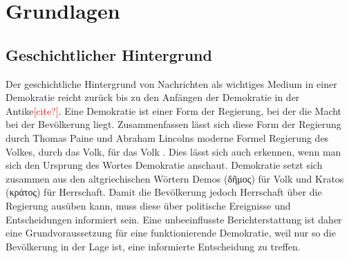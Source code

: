 \section{Grundlagen}

\subsection{Geschichtlicher Hintergrund}\label{sec:story-background}
Der geschichtliche Hintergrund von Nachrichten als wichtiges Medium in einer Demokratie reicht zurück bis zu den Anfängen der Demokratie in der Antike\textcolor{red}{[cite?]}.
Eine Demokratie ist einer Form der Regierung, bei der die Macht bei der Bevölkerung liegt.
Zusammenfassen lässt sich diese Form der Regierung durch Thomas Paine und Abraham Lincolns moderne Formel \glqq Regierung des Volkes, durch das Volk, für das Volk\grqq{} \cite{lincoln}.
Dies lässt sich auch erkennen, wenn man sich den Ursprung des Wortes Demokratie anschaut.
Demokratie setzt sich zusammen aus den altgriechischen Wörtern Demos (\textgreek{δῆμος}) für Volk und Kratos (\textgreek{κράτος}) für Herrschaft.
Damit die Bevölkerung jedoch Herrschaft über die Regierung ausüben kann, muss diese über politische Ereignisse und Entscheidungen informiert sein.
Eine unbeeinflusste Berichterstattung ist daher eine Grundvoraussetzung für eine funktionierende Demokratie, weil nur so die Bevölkerung in der Lage ist, eine informierte Entscheidung zu treffen. \\


